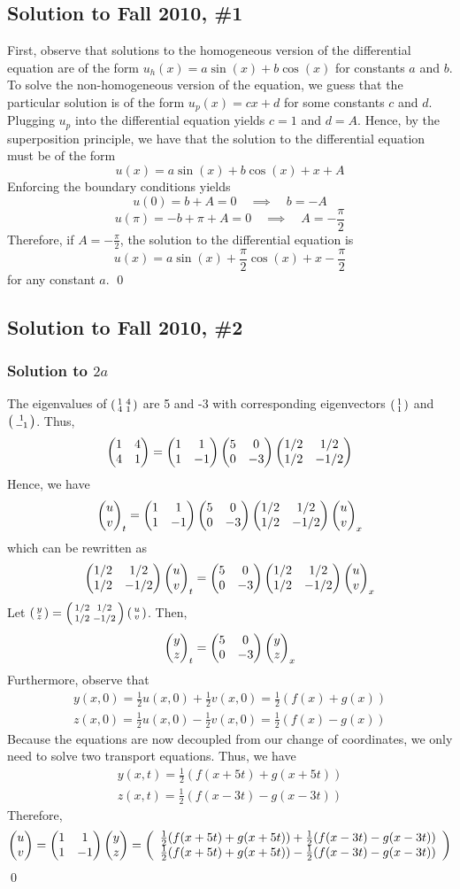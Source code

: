 \subsection*{Solution to Fall 2010, \#1} \label{F10Q1}

First, observe that solutions to the homogeneous version of the differential equation are of the form $u_h(x) = a \sin(x) + b \cos (x)$ for constants $a$ and $b$.
To solve the non-homogeneous version of the equation, we guess that the particular solution is of the form $u_p (x) = cx + d$ for some constants $c$ and $d$.
Plugging $u_p$ into the differential equation yields $c=1$ and $d=A$. Hence, by the superposition principle, we have that the solution to the differential equation must be of the form
$$ u(x) = a \sin(x) + b \cos(x) + x + A $$
Enforcing the boundary conditions yields
$$ u(0) = b + A = 0 \quad \implies \quad b = -A $$
$$u(\pi) = -b + \pi + A = 0 \quad \implies \quad A = -\frac{\pi}{2} $$
Therefore, if $A = -\frac{\pi}{2}$, the solution to the differential equation is
$$ u(x) = a\sin(x) + \frac{\pi}{2} \cos(x) + x - \frac{\pi}{2} $$
for any constant $a$. \hfill \qed

\subsection*{Solution to Fall 2010, \#2}
\label{F10Q2}

\subsubsection*{Solution to $2a$}

The eigenvalues of $\left(\begin{smallmatrix} 1 & 4 \\ 4 & 1\end{smallmatrix}\right)$ are 5 and -3 with corresponding eigenvectors $\left(\begin{smallmatrix} 1 \\ 1\end{smallmatrix}\right)$ and $\left(\begin{smallmatrix} 1 \\ -1\end{smallmatrix}\right)$. Thus,
$$ \begin{pmatrix} 1 & 4 \\ 4 & 1\end{pmatrix} = \begin{pmatrix} 1 & 1 \\ 1 & -1\end{pmatrix} \begin{pmatrix} 5 & 0 \\ 0 & -3\end{pmatrix} \begin{pmatrix} 1/2 & 1/2 \\ 1/2 & -1/2\end{pmatrix} $$
Hence, we have
$$ \begin{pmatrix} u \\ v\end{pmatrix}_t = \begin{pmatrix} 1 & 1 \\ 1 & -1\end{pmatrix} \begin{pmatrix} 5 & 0 \\ 0 & -3\end{pmatrix} \begin{pmatrix} 1/2 & 1/2 \\ 1/2 & -1/2\end{pmatrix} \begin{pmatrix} u \\ v\end{pmatrix}_x $$
which can be rewritten as
$$\begin{pmatrix} 1/2 & 1/2 \\ 1/2 & -1/2\end{pmatrix} \begin{pmatrix} u \\ v\end{pmatrix}_t = \begin{pmatrix} 5 & 0 \\ 0 & -3\end{pmatrix} \begin{pmatrix} 1/2 & 1/2 \\ 1/2 & -1/2\end{pmatrix} \begin{pmatrix} u \\ v\end{pmatrix}_x$$
Let $\left(\begin{smallmatrix} y \\ z\end{smallmatrix}\right) = \left(\begin{smallmatrix} 1/2 & 1/2 \\ 1/2 & -1/2\end{smallmatrix}\right) \left(\begin{smallmatrix} u \\ v\end{smallmatrix}\right)$. Then,
$$ \begin{pmatrix} y \\ z\end{pmatrix}_t = \begin{pmatrix} 5 & 0 \\ 0 & -3\end{pmatrix} \begin{pmatrix} y \\ z\end{pmatrix}_x $$
Furthermore, observe that
\begin{gather*}
y(x,0) = \frac{1}{2} u(x,0) + \frac{1}{2} v(x,0) = \frac{1}{2} (f(x) +g(x)) \\
z(x,0) = \frac{1}{2} u(x,0) - \frac{1}{2} v(x,0) = \frac{1}{2} (f(x) - g(x))
\end{gather*}
Because the equations are now decoupled from our change of coordinates, we only need to solve two transport equations. Thus, we have
\begin{gather*}
y(x,t) = \frac{1}{2} (f(x+5t) + g(x+5t)) \\
z(x,t) = \frac{1}{2} (f(x-3t) - g(x-3t))
\end{gather*}
Therefore,
$$ \begin{pmatrix} u \\ v\end{pmatrix} = \begin{pmatrix} 1 & 1 \\ 1 & -1\end{pmatrix} \begin{pmatrix} y \\ z\end{pmatrix} = \left(
\begin{array}{c}
\frac{1}{2} (f(x+5t) + g(x+5t)) + \frac{1}{2} (f(x-3t) - g(x-3t)) \\
\frac{1}{2} (f(x+5t) + g(x+5t)) - \frac{1}{2} (f(x-3t) - g(x-3t))
\end{array} \right) $$
\hfill \qed

